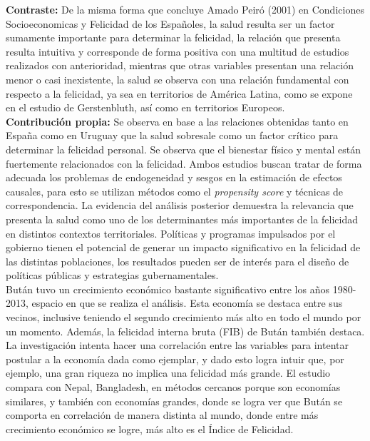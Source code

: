 \textbf{Contraste:} De la misma forma que concluye Amado Peiró (2001) en Condiciones Socioeconomicas y Felicidad de los Españoles, la salud resulta ser un factor sumamente importante para determinar la felicidad, la relación que presenta resulta intuitiva y corresponde de forma positiva con una multitud de estudios realizados con anterioridad, mientras que otras variables presentan una relación menor o casi inexistente, la salud se observa con una relación fundamental con respecto a la felicidad, ya sea en territorios de América Latina, como se expone en el estudio de Gerstenbluth, así como en territorios Europeos.\\

\textbf{Contribución propia: }Se observa en base a las relaciones obtenidas tanto en España como en Uruguay que la salud sobresale como un factor crítico para determinar la felicidad personal. Se observa que el bienestar físico y mental están fuertemente relacionados con la felicidad. Ambos estudios buscan tratar de forma adecuada los problemas de endogeneidad y sesgos en la estimación de efectos causales, para esto se utilizan métodos como el \textit{propensity score} y técnicas de correspondencia. La evidencia del análisis posterior demuestra la relevancia que presenta la salud como uno de los determinantes más importantes de la felicidad en distintos contextos territoriales. Políticas y programas impulsados por el gobierno tienen el potencial de generar un impacto significativo en la felicidad de las distintas poblaciones, los resultados pueden ser de interés para el diseño de políticas públicas y estrategias gubernamentales.\\

Bután tuvo un crecimiento económico bastante significativo entre los años 1980-2013, espacio en que se realiza el análisis. Esta economía se destaca entre sus vecinos, inclusive teniendo el segundo crecimiento más alto en todo el mundo por un momento. Además, la felicidad interna bruta (FIB) de Bután también destaca. La investigación intenta hacer una correlación entre las variables para intentar postular a la economía dada como ejemplar, y dado esto logra intuir que, por ejemplo, una gran riqueza no implica una felicidad más grande. El estudio compara con Nepal, Bangladesh, en métodos cercanos porque son economías similares, y también con economías grandes, donde se logra ver que Bután se comporta en correlación de manera distinta al mundo, donde entre más crecimiento económico se logre, más alto es el Índice de Felicidad.\\

